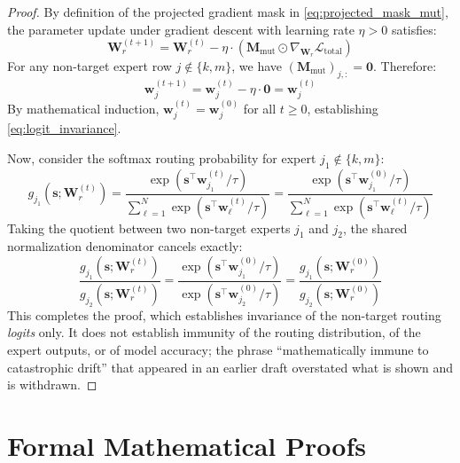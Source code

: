 \documentclass{article}
\theoremstyle{definition}
\begin{document}
\begin{proof}
By definition of the projected gradient mask in \cref{eq:projected_mask_mut}, the parameter update under gradient descent with learning rate $\eta > 0$ satisfies:
\begin{equation}
\mathbf{W}_r^{(t+1)} = \mathbf{W}_r^{(t)} - \eta \cdot \left( \mathbf{M}_{\mathrm{mut}} \odot \nabla_{\mathbf{W}_r} \mathcal{L}_{\mathrm{total}} \right)
\end{equation}
For any non-target expert row $j \notin \{k, m\}$, we have $(\mathbf{M}_{\mathrm{mut}})_{j,:} = \mathbf{0}$. Therefore:
\begin{equation}
\mathbf{w}_j^{(t+1)} = \mathbf{w}_j^{(t)} - \eta \cdot \mathbf{0} = \mathbf{w}_j^{(t)}
\end{equation}
By mathematical induction, $\mathbf{w}_j^{(t)} = \mathbf{w}_j^{(0)}$ for all $t \ge 0$, establishing \cref{eq:logit_invariance}. 

Now, consider the softmax routing probability for expert $j_1 \notin \{k, m\}$:
\begin{equation}
g_{j_1}(\mathbf{s}; \mathbf{W}_r^{(t)}) = \frac{\exp\left(\mathbf{s}^\top \mathbf{w}_{j_1}^{(t)} / \tau\right)}{\sum_{\ell=1}^N \exp\left(\mathbf{s}^\top \mathbf{w}_\ell^{(t)} / \tau\right)} = \frac{\exp\left(\mathbf{s}^\top \mathbf{w}_{j_1}^{(0)} / \tau\right)}{\sum_{\ell=1}^N \exp\left(\mathbf{s}^\top \mathbf{w}_\ell^{(t)} / \tau\right)}
\end{equation}
Taking the quotient between two non-target experts $j_1$ and $j_2$, the shared normalization denominator cancels exactly:
\begin{equation}
\frac{g_{j_1}(\mathbf{s}; \mathbf{W}_r^{(t)})}{g_{j_2}(\mathbf{s}; \mathbf{W}_r^{(t)})} = \frac{\exp\left(\mathbf{s}^\top \mathbf{w}_{j_1}^{(0)} / \tau\right)}{\exp\left(\mathbf{s}^\top \mathbf{w}_{j_2}^{(0)} / \tau\right)} = \frac{g_{j_1}(\mathbf{s}; \mathbf{W}_r^{(0)})}{g_{j_2}(\mathbf{s}; \mathbf{W}_r^{(0)})}
\end{equation}
This completes the proof, which establishes invariance of the non-target routing \emph{logits} only. It does not establish immunity of the routing distribution, of the expert outputs, or of model accuracy; the phrase ``mathematically immune to catastrophic drift'' that appeared in an earlier draft overstated what is shown and is withdrawn.
\end{proof}

\section{Formal Mathematical Proofs}
\label{sec:proofs}
\end{document}
